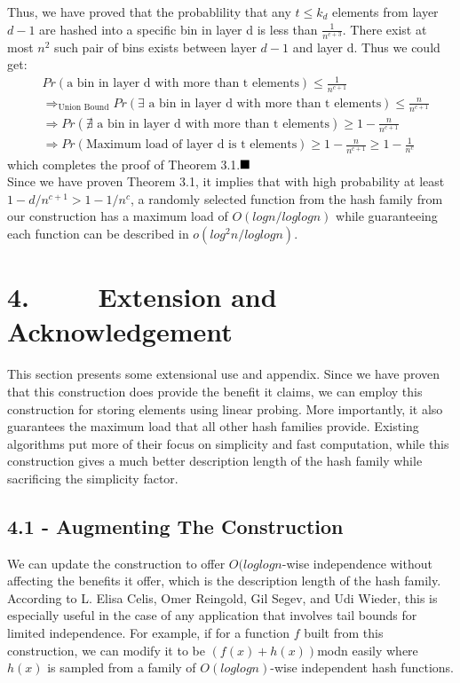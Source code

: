 \documentclass[a4paper, english]{paper}
\begin{document}
 Thus, we have proved that the probablility that any $t\le k_d$ elements from layer $d-1$ are hashed into a specific bin in layer d is less than $\frac{1}{n^{c+3}}$. There exist at most $n^2$ such pair of bins exists between layer $d-1$ and layer d. Thus we could get:
\begin{align*}
&Pr(\text{a bin in layer d with more than t elements})\le\frac1{n^{c+1}}\\
&\Rightarrow_{\text{Union Bound}} Pr(\exists\text{ a bin in layer d with more than t elements})\le\frac n{n^{c+1}}\\
&\Rightarrow Pr(\nexists\text{ a bin in layer d with more than t elements})\ge 1-\frac n{n^{c+1}}\\
&\Rightarrow Pr(\text{Maximum load of layer d is t elements})\ge 1-\frac n{n^{c+1}}\ge 1-\frac1{n^c}
\end{align*}
which completes the proof of Theorem 3.1.$\hfill\blacksquare$ \\

Since we have proven Theorem 3.1, it implies that with high probability at least $1-d/n^{c+1} > 1-1/n^c$, a randomly selected function from the hash family from our construction has a maximum load of $O(logn/loglogn)$ while guaranteeing each function can be described in $o(log^2 n/loglogn)$. 


	 \section{4. $\qquad$ Extension and Acknowledgement}
\quad	 This section presents some extensional use and appendix. Since we have proven that this construction does provide the benefit it claims, we can employ this construction for storing elements using linear probing. More importantly, it also guarantees the maximum load that all other hash families provide. Existing algorithms put more of their focus on simplicity and fast computation, while this construction gives a much better description length of the hash family while sacrificing the simplicity factor.
	 
	 \subsection{4.1 - Augmenting The Construction} 
\quad	 We can update the construction to offer $O(loglogn$-wise independence without affecting the benefits it offer, which is the description length of the hash family. According to L. Elisa Celis, Omer Reingold, Gil Segev, and Udi Wieder, this is especially useful in the case of any application that involves tail bounds for limited independence. For example, if for a function $f$ built from this construction, we can modify it to be $(f(x)+h(x))$modn easily where $h(x)$ is sampled from a family of $O(loglogn)$-wise independent hash functions. 
	 
\end{document}
